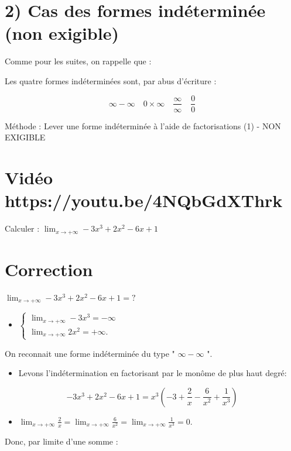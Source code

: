 \documentclass[10pt]{article}
\begin{document}
\section*{2) Cas des formes indéterminée (non exigible)}
Comme pour les suites, on rappelle que :

Les quatre formes indéterminées sont, par abus d'écriture :

$$
\infty-\infty \quad 0 \times \infty \quad \frac{\infty}{\infty} \quad \frac{0}{0}
$$

Méthode : Lever une forme indéterminée à l'aide de factorisations (1) - NON EXIGIBLE

\section*{Vidéo https://youtu.be/4NQbGdXThrk}
Calculer : $\lim _{x \rightarrow+\infty}-3 x^{3}+2 x^{2}-6 x+1$

\section*{Correction}
$\lim _{x \rightarrow+\infty}-3 x^{3}+2 x^{2}-6 x+1=?$

\begin{itemize}
  \item $\left\{\begin{array}{l}\lim _{x \rightarrow+\infty}-3 x^{3}=-\infty \\ \lim _{x \rightarrow+\infty} 2 x^{2}=+\infty .\end{array}\right.$
\end{itemize}

On reconnait une forme indéterminée du type " $\infty-\infty$ ".

\begin{itemize}
  \item Levons l'indétermination en factorisant par le monôme de plus haut degré:
\end{itemize}

$$
-3 x^{3}+2 x^{2}-6 x+1=x^{3}\left(-3+\frac{2}{x}-\frac{6}{x^{2}}+\frac{1}{x^{3}}\right)
$$

\begin{itemize}
  \item $\lim _{x \rightarrow+\infty} \frac{2}{x}=\lim _{x \rightarrow+\infty} \frac{6}{x^{2}}=\lim _{x \rightarrow+\infty} \frac{1}{x^{3}}=0$.
\end{itemize}

Donc, par limite d'une somme :
\end{document}
